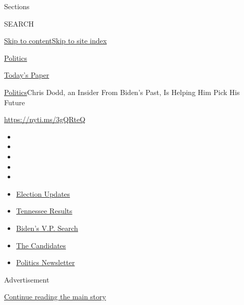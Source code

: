 Sections

SEARCH

\protect\hyperlink{site-content}{Skip to
content}\protect\hyperlink{site-index}{Skip to site index}

\href{https://www.nytimes.com/section/politics}{Politics}

\href{https://myaccount.nytimes.com/auth/login?response_type=cookie\&client_id=vi}{}

\href{https://www.nytimes.com/section/todayspaper}{Today's Paper}

\href{/section/politics}{Politics}\textbar{}Chris Dodd, an Insider From
Biden's Past, Is Helping Him Pick His Future

\href{https://nyti.ms/3gQRteQ}{https://nyti.ms/3gQRteQ}

\begin{itemize}
\item
\item
\item
\item
\item
\end{itemize}

\begin{itemize}
\item
  \href{https://www.nytimes.com/2020/08/07/us/elections/biden-vs-trump.html?action=click\&pgtype=Article\&state=default\&region=TOP_BANNER\&context=storylines_menu}{Election
  Updates}
\item
  \href{https://www.nytimes.com/interactive/2020/08/06/us/elections/results-tennessee-primary-elections.html?action=click\&pgtype=Article\&state=default\&region=TOP_BANNER\&context=storylines_menu}{Tennessee
  Results}
\item
  \href{https://www.nytimes.com/article/biden-vice-president-2020.html?action=click\&pgtype=Article\&state=default\&region=TOP_BANNER\&context=storylines_menu}{Biden's
  V.P. Search}
\item
  \href{https://www.nytimes.com/interactive/2019/us/politics/2020-presidential-candidates.html?action=click\&pgtype=Article\&state=default\&region=TOP_BANNER\&context=storylines_menu}{The
  Candidates}
\item
  \href{https://www.nytimes.com/newsletters/politics?action=click\&pgtype=Article\&state=default\&region=TOP_BANNER\&context=storylines_menu}{Politics
  Newsletter}
\end{itemize}

Advertisement

\protect\hyperlink{after-top}{Continue reading the main story}

